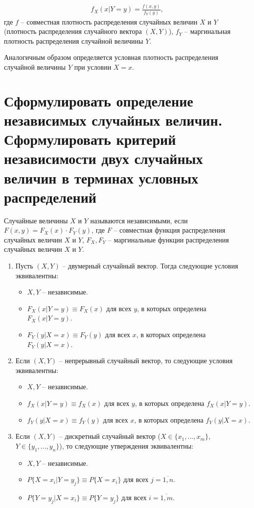 \begin{align*}
	f_X(x|Y=y) = \frac{f(x, y)}{f_Y(y)},
\end{align*}
где $f$ -- совместная плотность распределения случайных величин $X$ и $Y$ (плотность распределения случайного вектора $(X, Y)$), $f_Y$ -- маргинальная плотность распределения случайной величины $Y$.

Аналогичным образом определяется условная плотность распределения случайной величины $Y$ при условии $X = x$.

\section{Сформулировать определение независимых случайных величин. Сформулировать критерий независимости двух случайных величин в терминах условных распределений}

Случайные величины $X$ и $Y$ называются независимыми, если $F(x, y) = F_X(x) \cdot F_Y(y)$, где $F$ -- совместная функция распределения случайных величин $X$ и $Y$, $F_X, F_Y$ -- маргинальные функции распределения случайных величин $X$ и $Y$.

\begin{enumerate}
	
	\item Пусть $(X, Y)$ -- двумерный случайный вектор. Тогда следующие условия эквивалентны: 
	
	\begin{itemize}
		\item $X, Y$ -- независимые.
		\item $F_X(x | Y=y) \equiv F_X(x)$ для всех $y$, в которых определена $F_X(x|Y=y)$.
		\item $F_Y(y | X=x) \equiv F_Y(y)$ для всех $x$, в которых определена $F_Y(y|X=x)$.
	\end{itemize}
	\item Если $(X, Y)$ -- непрерывный случайный вектор, то следующие условия эквивалентны: 
	\begin{itemize}
		\item $X, Y$ -- независимые.
		\item $f_X(x | Y=y) \equiv f_X(x)$ для всех $y$, в которых определена $f_X(x|Y=y)$.
		\item $f_Y(y | X=x) \equiv f_Y(y)$ для всех $x$, в которых определена $f_Y(y|X=x)$.
	\end{itemize}
	\item Если $(X, Y)$ -- дискретный случайный вектор ($X \in \{x_1, ..., x_m\}$, $Y \in \{y_1, ..., y_n\}$), то следующие утверждения эквивалентны:
	\begin{itemize}
		\item $X, Y$ -- независимые.
		\item $P\{X=x_i | Y=y_j\} \equiv P\{X=x_i\}$ для всех $j=\overline{1, n}$.
		\item $P\{Y=y_j | X=x_i\} \equiv P\{Y=y_j\}$ для всех $i=\overline{1, m}$.
	\end{itemize}
\end{enumerate}

